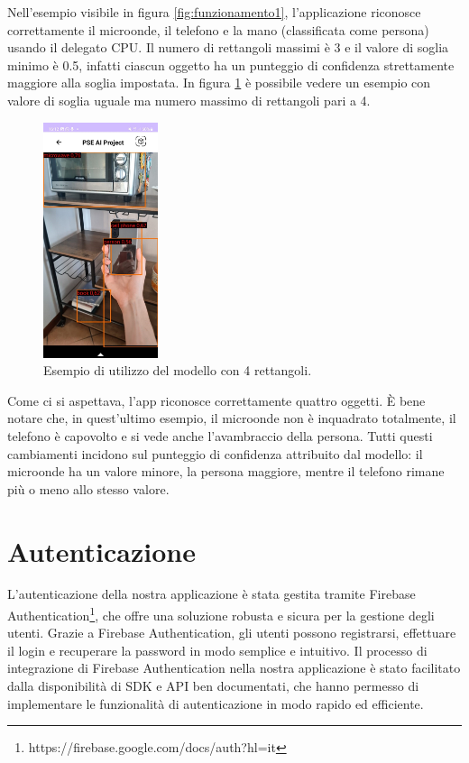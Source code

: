 Nell’esempio visibile in figura \ref{fig:funzionamento1}, l’applicazione riconosce correttamente il microonde, il telefono e la mano (classificata come persona) usando il delegato CPU.
Il numero di rettangoli massimi è 3 e il valore di soglia minimo è 0.5, infatti ciascun oggetto ha un punteggio di confidenza strettamente maggiore alla
soglia impostata.
In figura \ref{fig:funzionamento2} è possibile vedere un esempio con valore di soglia uguale ma numero massimo di rettangoli pari a 4.

\begin{figure}[H]
    \centering
    \includegraphics[width=0.3\textwidth]{Immagini/App/funzionamento_4rettangoli.jpeg}
    \caption{Esempio di utilizzo del modello con 4 rettangoli.}
    \label{fig:funzionamento2}
\end{figure}

Come ci si aspettava, l’app riconosce correttamente quattro oggetti.
È bene notare che, in quest’ultimo esempio, il microonde non è inquadrato totalmente, il telefono è capovolto e si vede anche l’avambraccio della persona.
Tutti questi cambiamenti incidono sul punteggio di confidenza attribuito dal modello: il microonde ha un valore minore, la persona maggiore,
mentre il telefono rimane più o meno allo stesso valore.

\section{Autenticazione}
L'autenticazione della nostra applicazione è stata gestita tramite Firebase Authentication\footnote{https://firebase.google.com/docs/auth?hl=it}, che
offre una soluzione robusta e sicura per la gestione degli utenti. Grazie a Firebase Authentication, gli utenti possono registrarsi, effettuare il login
e recuperare la password in modo semplice e intuitivo. Il processo di integrazione di Firebase Authentication nella nostra applicazione è stato facilitato
dalla disponibilità di SDK e API ben documentati, che hanno permesso di implementare le funzionalità di autenticazione in modo rapido ed efficiente.


